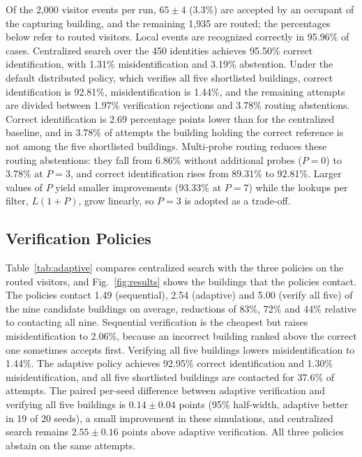 \documentclass[pdflatex,sn-mathphys-num]{sn-jnl}%
\theoremstyle{thmstyleone}%
\theoremstyle{thmstyletwo}%
\theoremstyle{thmstylethree}%
\begin{document}
Of the 2,000 visitor events per run, $65\pm4$ (3.3\%) are accepted by an occupant of the capturing building, and the remaining 1,935 are routed; the percentages below refer to routed visitors. Local events are recognized correctly in 95.96\% of cases. Centralized search over the 450 identities achieves 95.50\% correct identification, with 1.31\% misidentification and 3.19\% abstention. Under the default distributed policy, which verifies all five shortlisted buildings, correct identification is 92.81\%, misidentification is 1.44\%, and the remaining attempts are divided between 1.97\% verification rejections and 3.78\% routing abstentions. Correct identification is 2.69 percentage points lower than for the centralized baseline, and in 3.78\% of attempts the building holding the correct reference is not among the five shortlisted buildings. Multi-probe routing reduces these routing abstentions: they fall from 6.86\% without additional probes ($P=0$) to 3.78\% at $P=3$, and correct identification rises from 89.31\% to 92.81\%. Larger values of $P$ yield smaller improvements (93.33\% at $P=7$) while the lookups per filter, $L(1+P)$, grow linearly, so $P=3$ is adopted as a trade-off.

\subsection{Verification Policies}

Table~\ref{tab:adaptive} compares centralized search with the three policies on the routed visitors, and Fig.~\ref{fig:results} shows the buildings that the policies contact. The policies contact 1.49 (sequential), 2.54 (adaptive) and 5.00 (verify all five) of the nine candidate buildings on average, reductions of 83\%, 72\% and 44\% relative to contacting all nine. Sequential verification is the cheapest but raises misidentification to 2.06\%, because an incorrect building ranked above the correct one sometimes accepts first. Verifying all five buildings lowers misidentification to 1.44\%. The adaptive policy achieves 92.95\% correct identification and 1.30\% misidentification, and all five shortlisted buildings are contacted for 37.6\% of attempts. The paired per-seed difference between adaptive verification and verifying all five buildings is $0.14\pm0.04$ points (95\% half-width, adaptive better in 19 of 20 seeds), a small improvement in these simulations, and centralized search remains $2.55\pm0.16$ points above adaptive verification. All three policies abstain on the same attempts.
\end{document}
